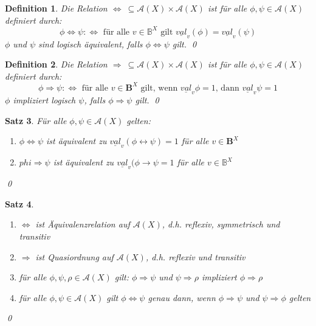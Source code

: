 \documentclass[ngerman]{scrartcl}
\theoremstyle{custom}
\newtheorem{mdef}{Definition} \numberwithin{mdef}{subsection}
\newtheorem{ms}[mdef]{Satz}
\newcommand{\ax}{\mathcal{A}(X)}
\newcommand{\val}{\underline{val}_v}
\newcommand{\0}{\mathbf{0}}
\newcommand{\1}{\mathbf{L}}
\begin{document}
\begin{mdef}
Die Relation $\Leftrightarrow ~ \subseteq \ax \times \ax$ ist f\"ur alle
$\phi, \psi \in \ax$ definiert durch:\\
\begin{equation*}
\phi \Leftrightarrow \psi :\Longleftrightarrow \text{ f\"ur alle } v \in
\mathds{B}^X \text{ gilt } \val(\phi) = \val(\psi)
\end{equation*}
$\phi$ und $\psi$ sind \emph{logisch \"aquivalent}, falls $\phi
\Leftrightarrow \psi$ gilt. \qed
\end{mdef}
\begin{mdef}
Die Relation $\Rightarrow ~ \subseteq \ax \times \ax$ ist f\"ur alle
$\phi, \psi \in \ax$ definiert durch:\\
\begin{equation*}
\phi \Rightarrow \psi :\Longleftrightarrow \text{ f\"ur alle } v \in
\mathbf{B}^X \text{ gilt, wenn } \val{\phi}=1 \text{, dann }
\val{\psi}=1
\end{equation*}
$\phi$ \emph{impliziert logisch} $\psi$, falls $\phi
\Rightarrow \psi$ gilt. \qed
\end{mdef}

\begin{ms} F\"ur alle $\phi, \psi \in \ax$ gelten:
\begin{enumerate} 
\item $\phi \Leftrightarrow \psi$ ist \"aquivalent zu $\val(\phi
  \leftrightarrow \psi)=1$ f\"ur alle $v \in \mathbf{B}^X$
\item $phi \Rightarrow \psi$ ist \"aquivalent zu $\val(\phi
  \rightarrow \psi = 1$ f\"ur alle $v \in \mathds{B}^X$
\end{enumerate}
\qed
\end{ms}

\begin{ms} 

\begin{enumerate}
\item $\Leftrightarrow$ ist \"Aquivalenzrelation auf $\ax$,
  d.h. reflexiv, symmetrisch und transitiv
\item $\Rightarrow$ ist Quasiordnung auf $\ax$, d.h. reflexiv und
  transitiv
\item f\"ur alle $\phi, \psi, \rho \in \ax$ gilt: $\phi \Rightarrow
  \psi$ und $\psi \Rightarrow \rho$ impliziert $\phi \Rightarrow \rho$
\item f\"ur alle $\phi, \psi \in \ax$ gilt $\phi \Leftrightarrow \psi$
  genau dann, wenn $\phi \Rightarrow \psi$ und $\psi \Rightarrow \phi$
  gelten
\end{enumerate}
\qed
\end{ms}
\end{document}
